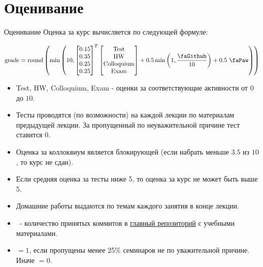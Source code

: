 \documentclass[9pt, aspectratio=169]{beamer}
\begin{document}
\section{Оценивание}
\begin{frame}{Оценивание}
    Оценка за курс вычисляется по следующей формуле:

    $$
    \text{grade} = \text{round}\left(\min\left(10, \begin{bmatrix}
        0.15 \\ 0.35 \\ 0.25 \\ 0.25
    \end{bmatrix}^T \begin{bmatrix}
        \text{Test} \\ \text{HW} \\ \text{Colloquium} \\ \text{Exam}
    \end{bmatrix} + 0.5\min \left(1, \dfrac{\text{\faGithub}}{10}\right)+ 0.5 \text{ \faPaw}\right)\right)
    $$

    \begin{itemize}
        \item Test, HW, Colloquium, Exam - оценки за соответствующие активности от $0$ до $10$.
        \item Тесты проводятся (по возможности) на каждой лекции по материалам предыдущей лекции. За пропущенный по неуважительной причине тест ставится $0$. 
        \item Оценка за коллоквиум является блокирующей (если набрать меньше $3.5$ из $10$, то курс не сдан). 
        \item Если средняя оценка за тесты ниже 5, то оценка за курс не может быть выше 5.
        \item Домашние работы выдаются по темам каждого занятия в конце лекции.
        \item \faGithub~- количество принятых коммитов в \underline{\href{https://github.com/MerkulovDaniil/optim}{главный репозиторий}} с учебными материалами.
        \item \faPaw \; $=1$, если пропущены менее 25\% семинаров не по уважительной причине. Иначе \faPaw \;$=0$.
    \end{itemize}
    
\end{frame}
\end{document}
